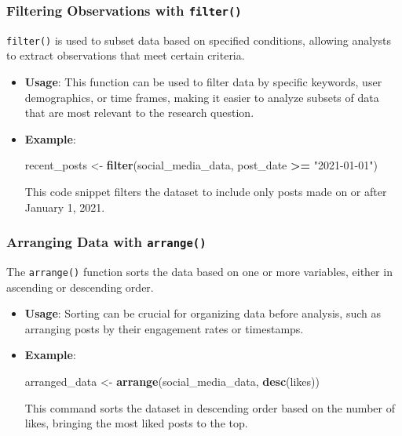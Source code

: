 \documentclass[
]{book}
\newenvironment{Shaded}{\begin{snugshade}}{\end{snugshade}}
\newcommand{\FunctionTok}[1]{\textcolor[rgb]{0.13,0.29,0.53}{\textbf{#1}}}
\newcommand{\NormalTok}[1]{#1}
\newcommand{\OtherTok}[1]{\textcolor[rgb]{0.56,0.35,0.01}{#1}}
\newcommand{\SpecialCharTok}[1]{\textcolor[rgb]{0.81,0.36,0.00}{\textbf{#1}}}
\newcommand{\StringTok}[1]{\textcolor[rgb]{0.31,0.60,0.02}{#1}}
\begin{document}
\hypertarget{filtering-observations-with-filter}{%
\subsubsection{\texorpdfstring{Filtering Observations with \texttt{filter()}}{Filtering Observations with filter()}}\label{filtering-observations-with-filter}}

\texttt{filter()} is used to subset data based on specified conditions, allowing analysts to extract observations that meet certain criteria.

\begin{itemize}
\item
  \textbf{Usage}: This function can be used to filter data by specific keywords, user demographics, or time frames, making it easier to analyze subsets of data that are most relevant to the research question.
\item
  \textbf{Example}:

\begin{Shaded}
\begin{Highlighting}[]
\NormalTok{recent\_posts }\OtherTok{\textless{}{-}} \FunctionTok{filter}\NormalTok{(social\_media\_data, post\_date }\SpecialCharTok{\textgreater{}=} \StringTok{"2021{-}01{-}01"}\NormalTok{)}
\end{Highlighting}
\end{Shaded}

  This code snippet filters the dataset to include only posts made on or after January 1, 2021.
\end{itemize}

\hypertarget{arranging-data-with-arrange}{%
\subsubsection{\texorpdfstring{Arranging Data with \texttt{arrange()}}{Arranging Data with arrange()}}\label{arranging-data-with-arrange}}

The \texttt{arrange()} function sorts the data based on one or more variables, either in ascending or descending order.

\begin{itemize}
\item
  \textbf{Usage}: Sorting can be crucial for organizing data before analysis, such as arranging posts by their engagement rates or timestamps.
\item
  \textbf{Example}:

\begin{Shaded}
\begin{Highlighting}[]
\NormalTok{arranged\_data }\OtherTok{\textless{}{-}} \FunctionTok{arrange}\NormalTok{(social\_media\_data, }\FunctionTok{desc}\NormalTok{(likes))}
\end{Highlighting}
\end{Shaded}

  This command sorts the dataset in descending order based on the number of likes, bringing the most liked posts to the top.
\end{itemize}
\end{document}
